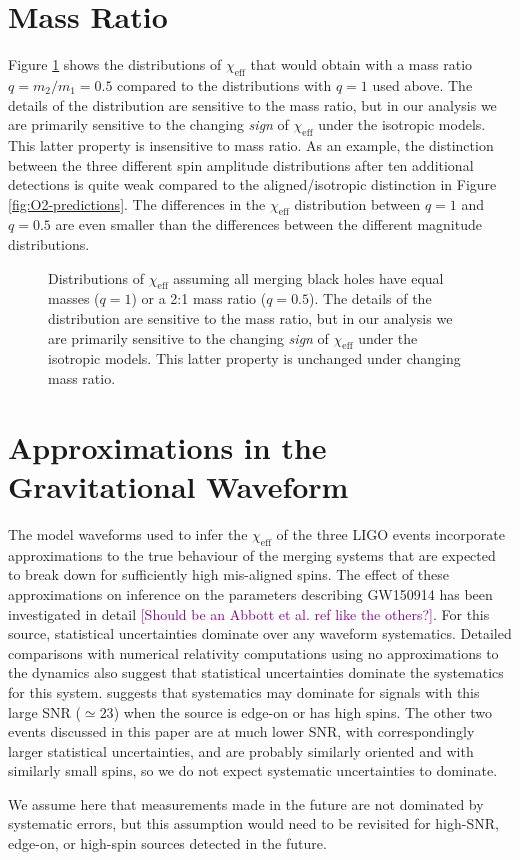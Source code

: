 \documentclass[modern,linenumbers]{aastex61}
\newcommand{\chieff}{\chi_\mathrm{eff}}
\newcommand{\ilya}[1]{\textcolor{purple}{#1}}
\begin{document}
\section{Mass Ratio}
\label{sec:mass-ratio}

Figure \ref{fig:mass-ratio-sensitivity} shows the distributions of
$\chieff$ that would obtain with a mass ratio $q = m_2/m_1 = 0.5$
compared to the distributions with $q = 1$ used above.  The details of
the distribution are sensitive to the mass ratio, but in our analysis
we are primarily sensitive to the changing \emph{sign} of $\chieff$
under the isotropic models.  This latter property is insensitive to
mass ratio.  As an example, the distinction between the three
different spin amplitude distributions after ten additional detections
is quite weak compared to the aligned/isotropic distinction in Figure
\ref{fig:O2-predictions}.  The differences in the $\chieff$
distribution between $q = 1$ and $q = 0.5$ are even smaller than the
differences between the different magnitude distributions.

\begin{figure}
  \caption{Distributions of $\chieff$ assuming all merging black holes
    have equal masses ($q=1$) or a 2:1 mass ratio ($q = 0.5$).  The
    details of the distribution are sensitive to the mass ratio, but
    in our analysis we are primarily sensitive to the changing
    \emph{sign} of $\chieff$ under the isotropic models.  This latter
    property is unchanged under changing mass ratio.}
  \label{fig:mass-ratio-sensitivity}
\end{figure}

\section{Approximations in the Gravitational Waveform}
The model waveforms used to infer the $\chieff$ of the three LIGO
events incorporate approximations to the true behaviour of the merging
systems that are expected to break down for sufficiently high
mis-aligned spins.  The effect of these approximations on inference on
the parameters describing GW150914 has been investigated in detail
\citep{2016arXiv161107531T} \ilya{[Should be an Abbott et al. ref like
  the others?]}.  For this source, statistical uncertainties dominate
over any waveform systematics.  Detailed comparisons with numerical
relativity computations using no approximations to the dynamics
\citep{2016PhRvD..94f4035A} also suggest that statistical
uncertainties dominate the systematics for this system.
\citet{2016arXiv161107531T} suggests that systematics may dominate for
signals with this large SNR ($\simeq 23$) when the source is edge-on
or has high spins.  The other two events discussed in this paper are
at much lower SNR, with correspondingly larger statistical
uncertainties, and are probably similarly oriented and with similarly
small spins, so we do not expect systematic uncertainties to dominate.

We assume here that measurements made in the future are not dominated
by systematic errors, but this assumption would need to be revisited
for high-SNR, edge-on, or high-spin sources detected in the future.


\end{document}
